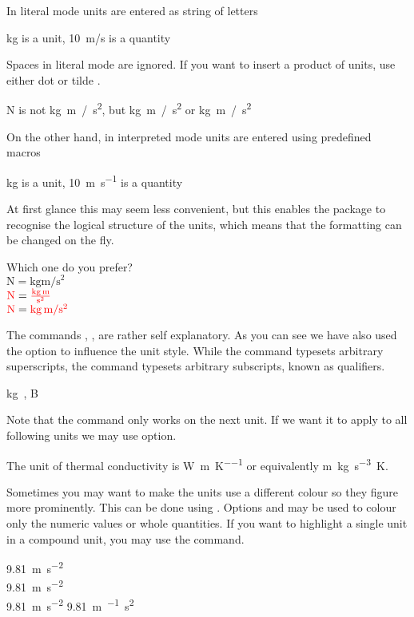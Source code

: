 In literal mode units are entered as string of letters 
\begin{example}
\unit{kg} is a unit,
\qty{10}{m/s} is a quantity
\end{example}
Spaces in literal mode are ignored. If you want to insert a product of units,
use either dot  or tilde \ai{\~}.
\begin{example}
\unit{N} is 
not \unit{kg m / s^2},
but \unit{kg.m / s^2}
or \unit{kg~m / s^2}
\end{example}

On the other hand, in interpreted mode units are entered using predefined
macros
\begin{example}
\unit{\kilo\gram} is a unit,
\qty{10}{\metre\per\second}
is a quantity
\end{example}
At first glance this may seem less convenient, but this enables the package to
recognise the logical structure of the units, which means that the formatting
can be changed on the fly.
\begin{example}[examplewidth=0.32\linewidth]
Which one do you prefer? \\
$\unit{\newton} = \unit{
  \kilo\gram\metre\per\square\second}$ \\
$\unit{\newton} = \unit[per-mode = fraction]{
  \kilo\gram\metre\per\second\squared}$ \\
$\unit{\N} = \unit[per-mode = symbol]{
  \kg\m\per\s\tothe{2}}$
\end{example}
The commands , ,  are rather self explanatory. As you
can see we have also used the  option to influence the unit
style. While the command  typesets arbitrary superscripts, the
command  typesets arbitrary subscripts, known as qualifiers.
\begin{example}[examplewidth=0.32\linewidth]
\unit{\kg{}}, \unit{\bel{}}
\end{example}

Note that the  command only works on the next unit. If we want it to
apply to all following units we may use  option.
\begin{example}[examplewidth=0.4\linewidth]
The unit of thermal conductivity is
\unit{\watt\per\metre\per\kelvin}
or equivalently
\unit[sticky-per]{\m\kg\per\s\cubed\K}. 
\end{example}

Sometimes you may want to make the units use a different colour so they figure more prominently. This can be done using . Options
 and  may be used to colour only the numeric
values or whole quantities. If you want to highlight a single unit in a
compound unit, you may use the  command.
\begin{example}[examplewidth=0.2\linewidth]
\qty[unit-color = red]{9.81}{\m\per\s\squared} \\
\qty[number-color = blue]{9.81}{\m\per\s\squared} \\
\qty[color = green]{9.81}{\m\per\s\squared}
\qty{9.81}{\m\per{}\s\squared}
\end{example}

